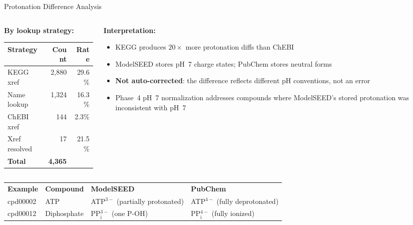 \documentclass[aspectratio=169,11pt]{beamer}
\begin{document}
\begin{frame}{Protonation Difference Analysis}

\begin{columns}[T]
\begin{column}{0.45\textwidth}
\textbf{By lookup strategy:}
\begin{table}[h]
\centering
\begin{tabular}{lrr}
\toprule
\textbf{Strategy} & \textbf{Count} & \textbf{Rate} \\
\midrule
KEGG xref    & 2,880 & 29.6\% \\
Name lookup  & 1,324 & 16.3\% \\
ChEBI xref   &   144 &  2.3\% \\
Xref resolved &   17 & 21.5\% \\
\midrule
\textbf{Total} & \textbf{4,365} & \\
\bottomrule
\end{tabular}
\end{table}
\end{column}

\begin{column}{0.50\textwidth}
\textbf{Interpretation:}\small
\begin{itemize}\setlength\itemsep{3pt}
  \item KEGG produces $20\times$ more protonation diffs than ChEBI
  \item ModelSEED stores pH~7 charge states;
        PubChem stores neutral forms
  \item \textbf{Not auto-corrected}: the difference reflects
        different pH conventions, not an error
  \item Phase~4 pH~7 normalization addresses compounds where
        ModelSEED's stored protonation was inconsistent with pH~7
\end{itemize}
\end{column}
\end{columns}

\bigskip
\begin{center}
\footnotesize
\begin{tabular}{llll}
\textbf{Example} & \textbf{Compound} & \textbf{ModelSEED} & \textbf{PubChem} \\
cpd00002 & ATP & ATP$^{3-}$ (partially protonated) & ATP$^{4-}$ (fully deprotonated) \\
cpd00012 & Diphosphate & PP$_\text{i}^{3-}$ (one P-OH) & PP$_\text{i}^{4-}$ (fully ionized) \\
\end{tabular}
\end{center}

\end{frame}
\end{document}
